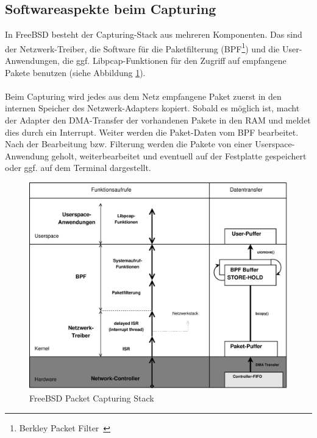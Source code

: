 \subsection{Softwareaspekte beim Capturing}\label{subsec:sw_cap}
In FreeBSD besteht der Capturing-Stack aus mehreren Komponenten.  Das sind der
Netzwerk-Treiber, die Software für die Paketfilterung (BPF\footnote{Berkley
Packet Filter~\cite{bpf_wiki, man_bpf, man_kernel_bpf}}) und die
User-Anwendungen, die ggf.  Libpcap-Funktionen für den Zugriff auf empfangene
Pakete benutzen (siehe Abbildung \ref{bsd_cap_stack}).\\\\
%
Beim Capturing wird jedes aus dem Netz empfangene Paket zuerst in den internen
Speicher des Netzwerk-Adapters kopiert. Sobald es möglich ist, macht der
Adapter den DMA-Transfer der vorhandenen Pakete in den RAM und meldet dies
durch ein Interrupt. Weiter werden die Paket-Daten vom BPF bearbeitet. Nach der
Bearbeitung bzw.  Filterung werden die Pakete von einer Userspace-Anwendung
geholt, weiterbearbeitet und eventuell auf der Festplatte gespeichert oder ggf.
auf dem Terminal dargestellt.
\begin{figure}
\centering \includegraphics[width=5.1in]{bilder/3copy}
\caption{FreeBSD Packet Capturing Stack}
\label{bsd_cap_stack}
\end{figure}
%
